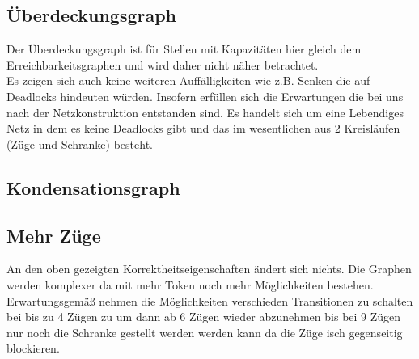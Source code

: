 \documentclass[10pt]{scrartcl}
\begin{document}
\subsection{Überdeckungsgraph}
Der Überdeckungsgraph ist für Stellen mit Kapazitäten hier gleich dem Erreichbarkeitsgraphen und wird daher nicht näher betrachtet.\\
Es zeigen sich auch keine weiteren Auffälligkeiten wie z.B. Senken die auf Deadlocks hindeuten würden. Insofern erfüllen sich die Erwartungen die bei uns nach der Netzkonstruktion entstanden sind. Es handelt sich um eine Lebendiges Netz in dem es keine Deadlocks gibt und das im wesentlichen aus 2 Kreisläufen (Züge und Schranke) besteht.

\subsection{Kondensationsgraph}


\subsection{Mehr Züge}	
An den oben gezeigten Korrektheitseigenschaften ändert sich nichts. Die Graphen werden komplexer da mit mehr Token noch mehr Möglichkeiten bestehen. Erwartungsgemäß nehmen die Möglichkeiten verschieden Transitionen zu schalten bei bis zu 4 Zügen zu um dann ab 6 Zügen wieder abzunehmen bis bei 9 Zügen nur noch die Schranke gestellt werden werden kann da die Züge isch gegenseitig blockieren.

		
\end{document}
